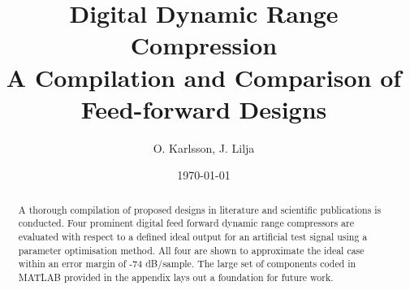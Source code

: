 \documentclass[]{article}
\begin{document}
\newcommand{\rootdir}{.}

\title{Digital Dynamic Range Compression \\ \Large A Compilation and Comparison of Feed-forward Designs}
\author{O. Karlsson, J. Lilja}
\date{\today}
\maketitle

\begin{abstract}
A thorough compilation of proposed designs in literature and scientific publications is conducted. Four prominent digital feed forward dynamic range compressors are evaluated with respect to a defined ideal output for an artificial test signal using a parameter optimisation method. All four are shown to approximate the ideal case within an error margin of -74 dB/sample. The large set of components coded in MATLAB\textsuperscript{\textregistered}  provided in the appendix lays out a foundation for future work.
\end{abstract}
\clearpage

\tableofcontents
\clearpage


\clearpage

%
%
%





\clearpage


\FloatBarrier
\clearpage


\end{document}
